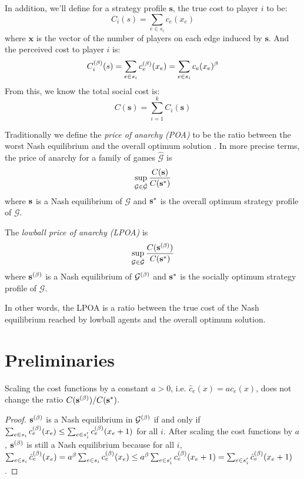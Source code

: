 \documentclass[twoside]{article}
\begin{document}
\begin{multicols}{2}
In addition, we'll define for a strategy profile $\mathbf{s}$, the true cost to
player $i$ to be: \[C_i(s) = \sum\limits_{e \in s_i}c_e(x_e)\] where
$\mathbf{x}$ is the vector of the number of players on each edge induced by
$\mathbf{s}$.  And the perceived cost to player $i$ is: \[C^{(\beta)}_i(s) =
\sum\limits_{e \in s_i}c_e^{(\beta)}(x_e) = \sum\limits_{e \in s_i}c_e(x_e)^\beta\]
From this, we know the total social cost is: \[C(\mathbf{s}) =
\sum_{i=1}^{k}C_i(\mathbf{s})\]
        
Traditionally we define the \textit{price of anarchy (POA)} to be the ratio
between the worst Nash equilibrium and the overall optimum solution
\cite{Koutsoupias2009}.  In more precise terms, the price of anarchy for a
family of games $\hat{\mathcal{G}}$ is \[\sup_{\mathcal{G} \in \hat{\mathcal{G}}}
\frac{C(\mathbf{s})}{C(\mathbf{s}^*)}\] where $\mathbf{s}$ is a Nash equilibrium of $\mathcal{G}$ and
$\mathbf{s}^*$ is the overall optimum strategy profile of $\mathcal{G}$.

\begin{defn}
  The \textit{lowball price of anarchy (LPOA)} is
  \begin{equation}
    \sup_{\mathcal{G} \in \hat{\mathcal{G}}} \frac{C(\mathbf{s}^{(\beta)})}{C(\mathbf{s}^*)}
    \label{eq:lpoa}
  \end{equation}
  where $\mathbf{s}^{(\beta)}$ is a Nash equilibrium of $\mathcal{G}^{(\beta)}$ and $\mathbf{s}^*$ is the
  socially optimum strategy profile of $\mathcal{G}$.
\end{defn}
In other words, the LPOA is a ratio between the true cost of the Nash
equilibrium reached by lowball agents and the overall optimum solution.

\section{Preliminaries}
\begin{lem} \label{lem:scale}
  Scaling the cost functions by a constant $a > 0$, i.e. $\hat c_e(x) = a
  c_e(x)$, does not change the ratio $C(\mathbf{s}^{(\beta)})/C(\mathbf{s}^*)$.
\end{lem}
\begin{proof}
  $\mathbf{s}^{(\beta)}$ is a Nash equilibrium in $\mathcal{G}^{(\beta)}$ if and only if $\sum_{e
  \in s_i} c_e^{(\beta)}(x_e) \le \sum_{e \in s_i'} c_e^{(\beta)}(x_e + 1)$ for all $i$.
  After scaling the cost functions by $a$, $\mathbf{s}^{(\beta)}$ is still a Nash equilibrium
  because for all $i$, $\sum_{e \in s_i} \hat c_e^{(\beta)}(x_e) = a^\beta \sum_{e
  \in s_i} c_e^{(\beta)}(x_e) \le a^\beta \sum_{e \in s_i'} c_e^{(\beta)}(x_e + 1) =
  \sum_{e \in s_i'} \hat c_e^{(\beta)}(x_e+1)$.


\end{proof}
\end{multicols}
\end{document}
